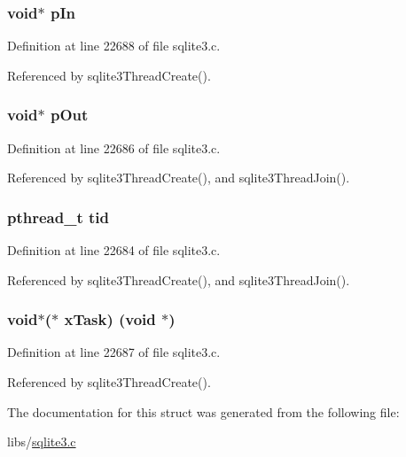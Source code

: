 \hypertarget{struct_s_q_lite_thread_af191c07d957a6f0d5ef67cfa10b745b9}{}
\subsubsection[{p\+In}]{\setlength{\rightskip}{0pt plus 5cm}void$\ast$ p\+In}\label{struct_s_q_lite_thread_af191c07d957a6f0d5ef67cfa10b745b9}


Definition at line 22688 of file sqlite3.\+c.



Referenced by sqlite3\+Thread\+Create().

\hypertarget{struct_s_q_lite_thread_a591d58e265bba73adfd65bfe275ab3c0}{}
\subsubsection[{p\+Out}]{\setlength{\rightskip}{0pt plus 5cm}void$\ast$ p\+Out}\label{struct_s_q_lite_thread_a591d58e265bba73adfd65bfe275ab3c0}


Definition at line 22686 of file sqlite3.\+c.



Referenced by sqlite3\+Thread\+Create(), and sqlite3\+Thread\+Join().

\hypertarget{struct_s_q_lite_thread_a3a5ba243b3ab4b6093afb178de0f9509}{}
\subsubsection[{tid}]{\setlength{\rightskip}{0pt plus 5cm}pthread\+\_\+t tid}\label{struct_s_q_lite_thread_a3a5ba243b3ab4b6093afb178de0f9509}


Definition at line 22684 of file sqlite3.\+c.



Referenced by sqlite3\+Thread\+Create(), and sqlite3\+Thread\+Join().

\hypertarget{struct_s_q_lite_thread_a32b4eee8a14e8878bd522115b8068d3d}{}
\subsubsection[{x\+Task}]{\setlength{\rightskip}{0pt plus 5cm}void$\ast$($\ast$ x\+Task) (void $\ast$)}\label{struct_s_q_lite_thread_a32b4eee8a14e8878bd522115b8068d3d}


Definition at line 22687 of file sqlite3.\+c.



Referenced by sqlite3\+Thread\+Create().



The documentation for this struct was generated from the following file\+:\begin{DoxyCompactItemize}
\item 
libs/\hyperlink{sqlite3_8c}{sqlite3.\+c}\end{DoxyCompactItemize}
